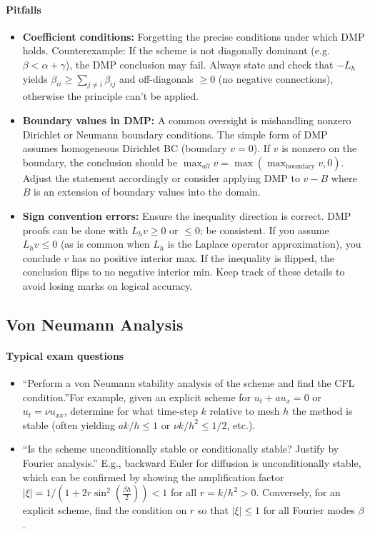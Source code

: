 \documentclass[a4paper,11pt]{article}
\begin{document}
\paragraph{Pitfalls}
\begin{itemize}
    \item \textbf{Coefficient conditions:} Forgetting the precise conditions under which DMP holds. Counterexample: If the scheme is not diagonally dominant (e.g. $\beta < \alpha+\gamma$), the DMP conclusion may fail. Always state and check that $-L_h$ yields $\beta_{ii}\ge \sum_{j\neq i}\beta_{ij}$ and off-diagonals $\ge0$ (no negative connections), otherwise the principle can't be applied.
    \item \textbf{Boundary values in DMP:} A common oversight is mishandling nonzero Dirichlet or Neumann boundary conditions. The simple form of DMP assumes homogeneous Dirichlet BC (boundary $v=0$). If $v$ is nonzero on the boundary, the conclusion should be $\max_{all} v = \max(\max_{\text{boundary}}v, 0)$. Adjust the statement accordingly or consider applying DMP to $v - B$ where $B$ is an extension of boundary values into the domain.
    \item \textbf{Sign convention errors:} Ensure the inequality direction is correct. DMP proofs can be done with $L_h v \ge 0$ or $\le0$; be consistent. If you assume $L_h v \le 0$ (as is common when $L_h$ is the Laplace operator approximation), you conclude $v$ has no positive interior max. If the inequality is flipped, the conclusion flips to no negative interior min. Keep track of these details to avoid losing marks on logical accuracy.
\end{itemize}

\clearpage
\subsection{Von Neumann Analysis}

\paragraph{Typical exam questions}
\begin{itemize}
    \item \enquote{Perform a von Neumann stability analysis of the scheme and find the CFL condition.}For example, given an explicit scheme for $u_t + au_x = 0$ or $u_t = \nu u_{xx}$, determine for what time-step $k$ relative to mesh $h$ the method is stable (often yielding $ak/h \le 1$ or $\nu k/h^2 \le 1/2$, etc.).
    \item \enquote{Is the scheme unconditionally stable or conditionally stable? Justify by Fourier analysis.} E.g., backward Euler for diffusion is unconditionally stable, which can be confirmed by showing the amplification factor $|\xi| = 1/(1+2r\sin^2(\frac{\beta h}{2})) < 1$ for all $r=k/h^2>0$. Conversely, for an explicit scheme, find the condition on $r$ so that $|\xi| \le 1$ for all Fourier modes $\beta$.
\end{itemize}
\end{document}
